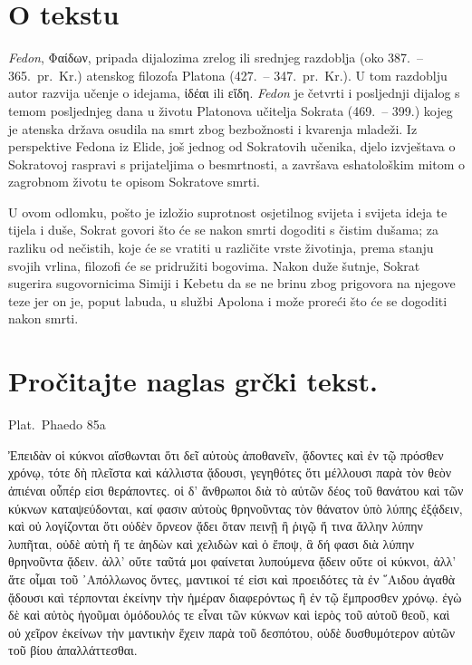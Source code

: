 


\section*{O tekstu}

\textit{Fedon}, Φαίδων, pripada dijalozima zrelog ili srednjeg razdoblja (oko 387.\ – 365.\ pr.~Kr.) atenskog filozofa Platona (427.\ – 347.\ pr.~Kr.). U tom razdoblju autor razvija učenje o idejama, ἰδέαι ili εἴδη. \textit{Fedon} je četvrti i posljednji dijalog s temom posljednjeg dana u životu Platonova učitelja Sokrata (469.\ – 399.) kojeg je atenska država osudila na smrt zbog bezbožnosti i kvarenja mladeži. Iz perspektive Fedona iz Elide, još jednog od Sokratovih učenika, djelo izvještava o Sokratovoj raspravi s prijateljima o besmrtnosti, a završava eshatološkim mitom o zagrobnom životu te opisom Sokratove smrti. 

U ovom odlomku, pošto je izložio suprotnost osjetilnog svijeta i svijeta ideja te tijela i duše, Sokrat govori što će se nakon smrti dogoditi s čistim dušama; za razliku od nečistih, koje će se vratiti u različite vrste životinja, prema stanju svojih vrlina, filozofi će se pridružiti bogovima. Nakon duže šutnje, Sokrat sugerira sugovornicima Simiji i Kebetu da se ne brinu zbog prigovora na njegove teze jer on je, poput labuda, u službi Apolona i može proreći što će se dogoditi nakon smrti.

\newpage

\section*{Pročitajte naglas grčki tekst.}

Plat.\ Phaedo 85a

\medskip

{\large
\begin{greek}
\noindent Ἐπειδὰν οἱ κύκνοι αἴσθωνται ὅτι δεῖ αὐτοὺς ἀποθανεῖν, ᾄδοντες καὶ ἐν τῷ πρόσθεν χρόνῳ, τότε δὴ πλεῖστα καὶ κάλλιστα ᾄδουσι, γεγηθότες ὅτι μέλλουσι παρὰ τὸν θεὸν ἀπιέναι οὗπέρ εἰσι θεράποντες. οἱ δ' ἄνθρωποι διὰ τὸ αὑτῶν δέος τοῦ θανάτου καὶ τῶν κύκνων καταψεύδονται, καί φασιν αὐτοὺς θρηνοῦντας τὸν θάνατον ὑπὸ λύπης ἐξᾴδειν, καὶ οὐ λογίζονται ὅτι οὐδὲν ὄρνεον ᾄδει ὅταν πεινῇ ἢ ῥιγῷ ἤ τινα ἄλλην λύπην λυπῆται, οὐδὲ αὐτὴ ἥ τε ἀηδὼν καὶ χελιδὼν καὶ ὁ ἔποψ, ἃ δή φασι διὰ λύπην θρηνοῦντα ᾄδειν. ἀλλ' οὔτε ταῦτά μοι φαίνεται λυπούμενα ᾄδειν οὔτε οἱ κύκνοι, ἀλλ' ἅτε οἶμαι τοῦ ᾿Απόλλωνος ὄντες, μαντικοί τέ εἰσι καὶ προειδότες τὰ ἐν ῞Αιδου ἀγαθὰ ᾄδουσι καὶ τέρπονται ἐκείνην τὴν ἡμέραν διαφερόντως ἢ ἐν τῷ ἔμπροσθεν χρόνῳ. ἐγὼ δὲ καὶ αὐτὸς ἡγοῦμαι ὁμόδουλός τε εἶναι τῶν κύκνων καὶ ἱερὸς τοῦ αὐτοῦ θεοῦ, καὶ οὐ χεῖρον ἐκείνων τὴν μαντικὴν ἔχειν παρὰ τοῦ δεσπότου,  οὐδὲ δυσθυμότερον αὐτῶν τοῦ βίου ἀπαλλάττεσθαι.

\end{greek}

}

